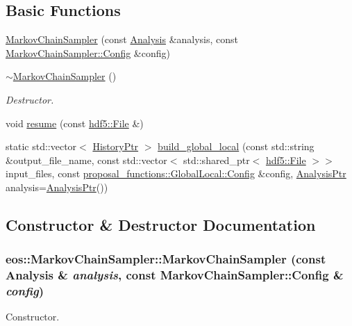 \subsection*{Basic Functions}
\label{_amgrp2386c9a1f1785edee33f374dd2db9b3d}
 \begin{DoxyCompactItemize}
\item 
\hyperlink{classeos_1_1MarkovChainSampler_a39df736664ab94605898df48c1ff97af}{MarkovChainSampler} (const \hyperlink{classeos_1_1Analysis}{Analysis} \&analysis, const \hyperlink{classeos_1_1MarkovChainSampler_1_1Config}{MarkovChainSampler::Config} \&config)
\item 
\hyperlink{classeos_1_1MarkovChainSampler_a9c8a8f22a6279a0e0457b6e58b3e7aee}{$\sim$MarkovChainSampler} ()
\begin{DoxyCompactList}\small\item\em Destructor. \item\end{DoxyCompactList}\item 
void \hyperlink{classeos_1_1MarkovChainSampler_a15f768e042ec2189ae7fb837d0c4f341}{resume} (const \hyperlink{classeos_1_1hdf5_1_1File}{hdf5::File} \&)
\item 
static std::vector$<$ \hyperlink{namespaceeos_ac9f30fde04446cfabdd69d4b5b5d3c5a}{HistoryPtr} $>$ \hyperlink{classeos_1_1MarkovChainSampler_ae493008479f15b080c40365f96a3e409}{build\_\-global\_\-local} (const std::string \&output\_\-file\_\-name, const std::vector$<$ std::shared\_\-ptr$<$ \hyperlink{classeos_1_1hdf5_1_1File}{hdf5::File} $>$$>$ input\_\-files, const \hyperlink{structeos_1_1proposal__functions_1_1GlobalLocal_1_1Config}{proposal\_\-functions::GlobalLocal::Config} \&config, \hyperlink{namespaceeos_afc57020492535ccdd85cfc3b7421340d}{AnalysisPtr} analysis=\hyperlink{namespaceeos_afc57020492535ccdd85cfc3b7421340d}{AnalysisPtr}())
\end{DoxyCompactItemize}


\subsection{Constructor \& Destructor Documentation}
\hypertarget{classeos_1_1MarkovChainSampler_a39df736664ab94605898df48c1ff97af}{
\subsubsection[{MarkovChainSampler}]{\setlength{\rightskip}{0pt plus 5cm}eos::MarkovChainSampler::MarkovChainSampler (const {\bf Analysis} \& {\em analysis}, \/  const {\bf MarkovChainSampler::Config} \& {\em config})}}
\label{classeos_1_1MarkovChainSampler_a39df736664ab94605898df48c1ff97af}
Constructor.


